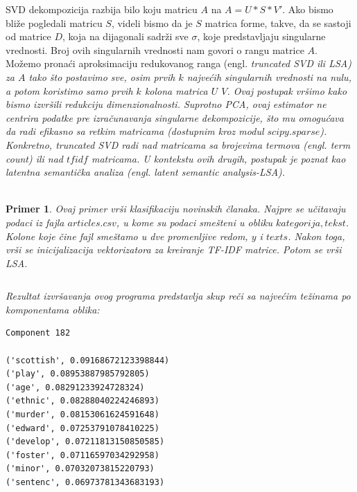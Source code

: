\documentclass[a4paper]{article}
\newtheorem{primer}{Primer}[section]
\begin{document}
SVD dekompozicija razbija bilo koju matricu $A$ na $A=U*S*V'$. Ako bismo bliže pogledali matricu $S$, videli bismo da je $S$ matrica forme, takve, da se sastoji od matrice $D$, koja na dijagonali sadrži sve $\sigma$, koje predstavljaju singularne vrednosti. Broj ovih singularnih vrednosti nam govori o rangu matrice $A$. Možemo pronaći aproksimaciju redukovanog ranga (engl. \em{truncated SVD} ili \em{LSA}) za $A$ tako što postavimo sve, osim prvih $k$ najvećih singularnih vrednosti na nulu, a potom koristimo samo prvih $k$ kolona matrica $U$  $V$. Ovaj postupak vršimo kako bismo izvršili redukciju dimenzionalnosti. Suprotno PCA, ovaj estimator ne centrira podatke pre izračunavanja singularne dekompozicije, što mu omogućava da radi efikasno sa retkim matricama (dostupnim kroz modul $scipy.sparse$). Konkretno, truncated SVD radi nad matricama sa brojevima termova (engl. \em{term count}) ili nad $tfidf$ matricama. U kontekstu ovih drugih, postupak je poznat kao latentna semantička analiza (engl. \em{latent semantic analysis-LSA}).\\\\
\begin{primer}
Ovaj primer vrši klasifikaciju novinskih članaka. Najpre se učitavaju podaci iz fajla $articles.csv$, u kome su podaci smešteni u obliku $kategorija, tekst$. Kolone koje čine fajl smeštamo u dve promenljive redom, $y$ i $texts$. Nakon toga, vrši se inicijalizacija vektorizatora za kreiranje TF-IDF matrice. Potom se vrši LSA.

\inputminted{python}{Codes/2/0-lsa.py}
Rezultat izvršavanja ovog programa predstavlja skup reči sa najvećim težinama po komponentama oblika:
\begin{lstlisting}
Component 182

('scottish', 0.09168672123398844)
('play', 0.08953887985792805)
('age', 0.08291233924728324)
('ethnic', 0.08288040224246893)
('murder', 0.08153061624591648)
('edward', 0.07253791078410225)
('develop', 0.07211813150850585)
('foster', 0.07116597034292958)
('minor', 0.07032073815220793)
('sentenc', 0.06973781343683193)
\end{lstlisting}
\end{primer}
\end{document}

